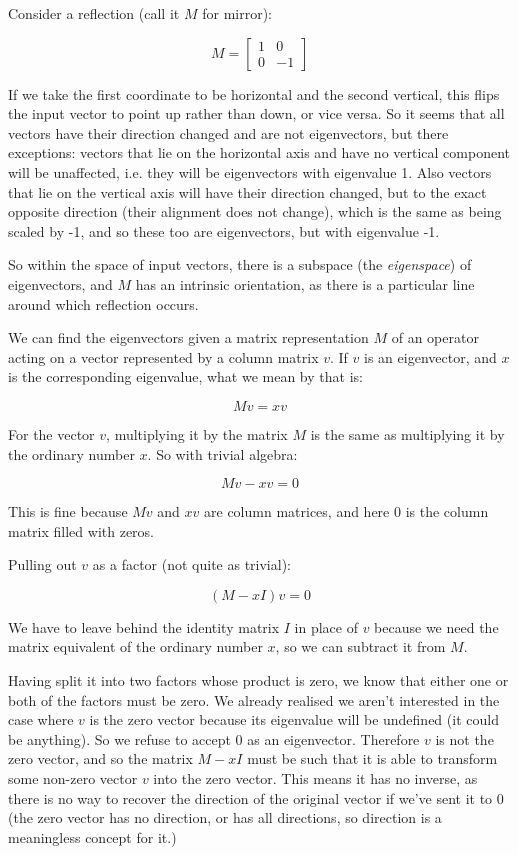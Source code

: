 Consider a reflection (call it $M$ for mirror):

$$M = \begin{bmatrix}1 & 0 \\ 0 & -1\end{bmatrix}$$

If we take the first coordinate to be horizontal and the second vertical, this flips the input vector to point up rather than down, or vice versa. So it seems that all vectors have their direction changed and are not eigenvectors, but there exceptions: vectors that lie on the horizontal axis and have no vertical component will be unaffected, i.e. they will be eigenvectors with eigenvalue 1. Also vectors that lie on the vertical axis will have their direction changed, but to the exact opposite direction (their alignment does not change), which is the same as being scaled by -1, and so these too are eigenvectors, but with eigenvalue -1.

So within the space of input vectors, there is a subspace (the \textit{eigenspace}) of eigenvectors, and $M$ has an intrinsic orientation, as there is a particular line around which reflection occurs.

We can find the eigenvectors given a matrix representation $M$ of an operator acting on a vector represented by a column matrix $v$. If $v$ is an eigenvector, and $x$ is the corresponding eigenvalue, what we mean by that is:

$$Mv = xv$$

For the vector $v$, multiplying it by the matrix $M$ is the same as multiplying it by the ordinary number $x$. So with trivial algebra:

$$Mv - xv = 0$$

This is fine because $Mv$ and $xv$ are column matrices, and here $0$ is the column matrix filled with zeros.

Pulling out $v$ as a factor (not quite as trivial):

$$(M - xI)v = 0$$

We have to leave behind the identity matrix $I$ in place of $v$ because we need the matrix equivalent of the ordinary number $x$, so we can subtract it from $M$.

Having split it into two factors whose product is zero, we know that either one or both of the factors must be zero. We already realised we aren't interested in the case where $v$ is the zero vector because its eigenvalue will be undefined (it could be anything). So we refuse to accept $0$ as an eigenvector. Therefore $v$ is not the zero vector, and so the matrix $M - xI$ must be such that it is able to transform some non-zero vector $v$ into the zero vector. This means it has no inverse, as there is no way to recover the direction of the original vector if we've sent it to $0$ (the zero vector has no direction, or has all directions, so direction is a meaningless concept for it.)

